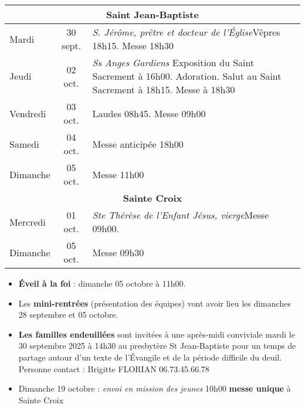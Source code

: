 \documentclass[french,11pt]{article}
\begin{document}
\begin{tabular} {lcp{9cm}}
\multicolumn{3}{c}{\textbf{Saint Jean-Baptiste} } \\ \hline
Mardi    & 30 sept.  &\emph{S. Jérôme, prêtre et docteur de l'Église}\newline  Vêpres 18h15. Messe 18h30 \\ \hline
Jeudi    & 02 oct. &\emph{Ss Anges Gardiens}\newline
Exposition du Saint Sacrement à 16h00. Adoration. Salut au Saint Sacrement à 18h15. Messe à 18h30 
 \\ \hline
Vendredi & 03 oct. & Laudes 08h45. Messe 09h00 \\ \hline
Samedi   & 04 oct. & Messe anticipée 18h00 \\ \hline
Dimanche  & 05 oct. & Messe 11h00\\ \hline
\multicolumn{3}{c}{\textbf{Sainte Croix} } \\ \hline
Mercredi & 01 oct.  & \emph{Ste Thérèse de l'Enfant Jésus, vierge}\newline Messe 09h00. \\ \hline
Dimanche  & 05 oct. & Messe 09h30\\ \hline
\end{tabular}

\begin{framed}
\begin{itemize}
\item
\textbf{Éveil à la foi} : dimanche 05 octobre à 11h00.
\item
Les \textbf{mini-rentrées} (présentation des équipes) vont avoir lieu les dimanches 28 septembre et 05 octobre.
\item
\textbf{Les familles endeuillées} sont invitées à une après-midi conviviale mardi le 30 septembre 2025 à 14h30
au presbytère St Jean-Baptiste pour un temps de partage autour d'un texte de l’Évangile et de la période difficile du deuil.
Personne contact : Brigitte FLORIAN 06.73.45.66.78
\item
Dimanche 19 octobre : \emph{envoi en mission des jeunes} 10h00 \textbf{messe unique} à Sainte Croix
\end{itemize}
\end{framed}
\end{document}
